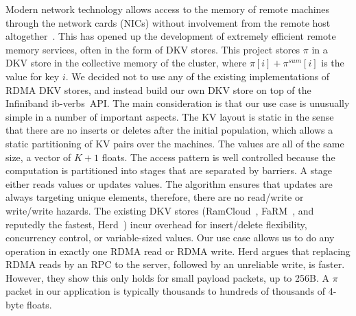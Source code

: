 Modern network technology allows access to the memory of remote machines
through the network cards (NICs) without involvement from the remote host
altogether~\cite{Hamada_infinibandtrade,Beck:2011:PER:2043535.2043537}.
This has opened up the development of
extremely efficient remote memory services, often in the form of DKV stores.
This project stores $\pi$ in a DKV store in the collective memory of the
cluster, where $\pi[i]+\pi^{sum}[i]$ is the value for key $i$. We decided not
to use any of the existing implementations of RDMA DKV stores, and instead
build our own DKV store on top of the Infiniband ib-verbs~API. The
main consideration is that our use case is unusually simple in a number
of important aspects. The KV layout is static in the sense that there are
no inserts or deletes after the initial population, which allows a static
partitioning of KV pairs over the machines. The values are all of the same size,
a vector of $K+1$ floats. The access pattern is well controlled because the
computation is partitioned into stages that are separated by barriers. A
stage either reads values or updates values. The algorithm ensures that updates
are always targeting unique elements,
therefore, there are no read/write or write/write hazards. The existing DKV
stores (RamCloud~\cite{Ousterhout:2015:RSS:2818727.2806887}, FaRM~\cite{179767},
and reputedly the fastest, Herd~\cite{Kalia:2014:URE:2740070.2626299}) incur
overhead for insert/delete flexibility, concurrency control, or variable-sized
values. Our use case allows us to do any operation in exactly one RDMA read
or RDMA write. Herd argues
that replacing RDMA reads by
an RPC to the server, followed by an unreliable write, is faster. However,
they show this only holds for small payload packets, up to 256B. A $\pi$
packet in our application is typically thousands to hundreds of thousands
of 4-byte floats.
